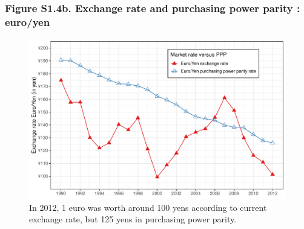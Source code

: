 \documentclass[t]{beamer}\usepackage[]{graphicx}\usepackage[]{color}
\newenvironment{knitrout}{}{} %
\begin{document}
\begin{frame}[label=Figure_S1_4b,fragile]
\frametitle{Figure S1.4b. Exchange rate and purchasing power parity : euro/yen}
\begin{figure}[t]
\begin{minipage}[b]{\textwidth}
\centering
\begin{knitrout}\footnotesize
{}\color{fgcolor}

{\centering \includegraphics[width=1\linewidth]{figures/color/Figure_S1_4b} 

}



\end{knitrout}
\caption{In 2012, 1 euro was worth around 100 yens according to current exchange rate, but 125 yens in purchasing power parity.}
\end{minipage}
\end{figure}
\end{frame}
\end{document}
